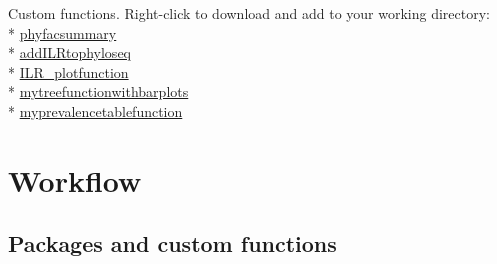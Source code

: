 \documentclass[
]{book}
\begin{document}
Custom functions. Right-click to download and add to your working directory:\\
* \href{./custom-functions/phyfacsummary.R}{phyfacsummary}\\
* \href{./custom-functions/addILRtophyloseq.R}{addILRtophyloseq}\\
* \href{./custom-functions/ILR_plotfunction.R}{ILR\_plotfunction}\\
* \href{./custom-functions/mytreefunctionwithbarplots.R}{mytreefunctionwithbarplots}\\
* \href{./custom-functions/myprevalencetablefunction}{myprevalencetablefunction}

\hypertarget{workflow-5}{%
\section{Workflow}\label{workflow-5}}

\hypertarget{packages-and-custom-functions}{%
\subsection{Packages and custom functions}\label{packages-and-custom-functions}}
\end{document}
